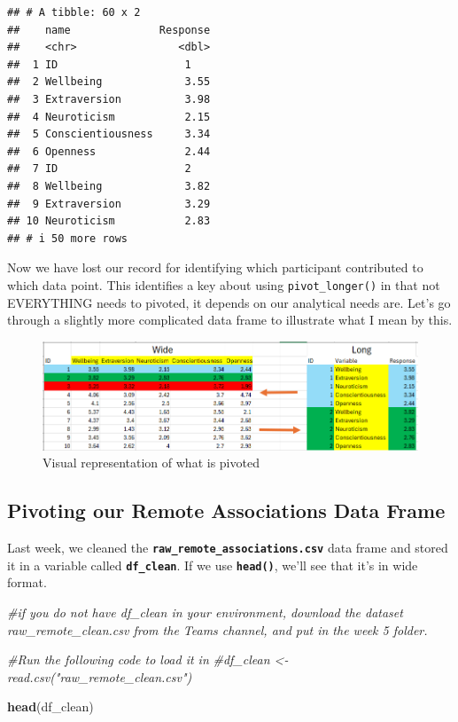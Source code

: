 \documentclass[
]{book}
\newenvironment{Shaded}{\begin{snugshade}}{\end{snugshade}}
\newcommand{\CommentTok}[1]{\textcolor[rgb]{0.56,0.35,0.01}{\textit{#1}}}
\newcommand{\FunctionTok}[1]{\textcolor[rgb]{0.13,0.29,0.53}{\textbf{#1}}}
\newcommand{\NormalTok}[1]{#1}
\begin{document}
\begin{verbatim}
## # A tibble: 60 x 2
##    name              Response
##    <chr>                <dbl>
##  1 ID                    1   
##  2 Wellbeing             3.55
##  3 Extraversion          3.98
##  4 Neuroticism           2.15
##  5 Conscientiousness     3.34
##  6 Openness              2.44
##  7 ID                    2   
##  8 Wellbeing             3.82
##  9 Extraversion          3.29
## 10 Neuroticism           2.83
## # i 50 more rows
\end{verbatim}

Now we have lost our record for identifying which participant contributed to which data point. This identifies a key about using \texttt{pivot\_longer()} in that not EVERYTHING needs to pivoted, it depends on our analytical needs are. Let's go through a slightly more complicated data frame to illustrate what I mean by this.

\begin{figure}
\centering
\includegraphics{img/06-pivot-visualisation.png}
\caption{\label{fig:unnamed-chunk-230}Visual representation of what is pivoted}
\end{figure}

\hypertarget{pivoting-our-remote-associations-data-frame}{%
\subsection{Pivoting our Remote Associations Data Frame}\label{pivoting-our-remote-associations-data-frame}}

Last week, we cleaned the \textbf{\texttt{raw\_remote\_associations.csv}} data frame and stored it in a variable called \textbf{\texttt{df\_clean}}. If we use \textbf{\texttt{head()}}, we'll see that it's in wide format.

\begin{Shaded}
\begin{Highlighting}[]
\CommentTok{\#if you do not have df\_clean in your environment, download the dataset \textasciigrave{}raw\_remote\_clean.csv\textasciigrave{} from the Teams channel, and put in the week 5 folder. }

\CommentTok{\#Run the following code to load it in }
\CommentTok{\#df\_clean \textless{}{-} read.csv("raw\_remote\_clean.csv") }

\FunctionTok{head}\NormalTok{(df\_clean)}
\end{Highlighting}
\end{Shaded}
\end{document}
